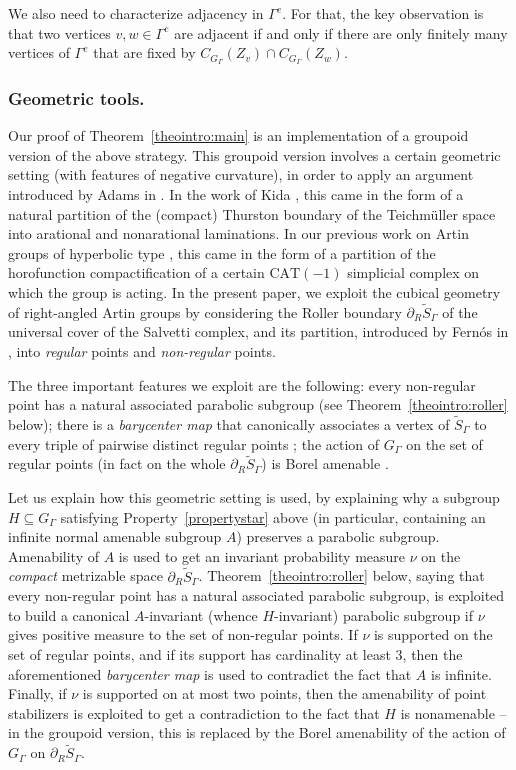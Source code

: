 We also need to characterize adjacency in $\Gamma^e$. For that, the key observation is that two vertices $v,w\in \Gamma^e$ are adjacent if and only if there are only finitely many vertices of $\Gamma^e$ that are fixed by $C_{G_\Gamma}(Z_v)\cap C_{G_\Gamma}(Z_w)$.

\subsubsection*{Geometric tools.} Our proof of Theorem~\ref{theointro:main} is an implementation of a groupoid version of the above strategy. This groupoid version involves a certain geometric setting (with features of negative curvature), in order to apply an argument introduced by Adams in \cite{Ada}. In the work of Kida \cite{Kid}, this came in the form of a natural partition of the (compact) Thurston boundary of the Teichmüller space into arational and nonarational laminations. In our previous work on Artin groups of hyperbolic type \cite{HH}, this came in the form of a partition of the horofunction compactification of a certain $\mathrm{CAT}(-1)$ simplicial complex on which the group is acting. In the present paper, we exploit the cubical geometry of right-angled Artin groups by considering the Roller boundary $\partial_R\widetilde{S}_\Gamma$ of the universal cover of the Salvetti complex, and its partition, introduced by Fernós in \cite{Fer}, into \emph{regular} points and \emph{non-regular} points.

The three important features we exploit are the following: every non-regular point has a natural associated parabolic subgroup (see Theorem~\ref{theointro:roller} below); there is a \emph{barycenter map} that canonically associates a vertex of $\widetilde{S}_\Gamma$ to every triple of pairwise distinct regular points \cite{FLM}; the action of $G_\Gamma$ on the set of regular points (in fact on the whole $\partial_R\widetilde{S}_\Gamma$) is Borel amenable \cite{NS,Duc}.

Let us explain how this geometric setting is used, by explaining why a subgroup $H\subseteq G_\Gamma$ satisfying Property~\eqref{propertystar} above (in particular, containing an infinite normal amenable subgroup $A$) preserves a parabolic subgroup. Amenability of $A$ is used to get an invariant probability measure $\nu$ on the \emph{compact} metrizable space $\partial_R\widetilde{S}_\Gamma$. Theorem~\ref{theointro:roller} below, saying that every non-regular point has a natural associated parabolic subgroup, is exploited to build a canonical $A$-invariant (whence $H$-invariant) parabolic subgroup if $\nu$ gives positive measure to the set of non-regular points. If $\nu$ is supported on the set of regular points, and if its support has cardinality at least $3$, then the aforementioned \emph{barycenter map} is used to contradict the fact that $A$ is infinite. Finally, if $\nu$ is supported on at most two points, then the amenability of point stabilizers is exploited to get a contradiction to the fact that $H$ is nonamenable -- in the groupoid version, this is replaced by the Borel amenability of the action of $G_\Gamma$ on $\partial_R\widetilde{S}_\Gamma$.

